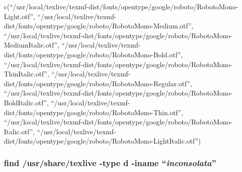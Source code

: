 \documentclass[
]{article}
\newenvironment{Shaded}{\begin{snugshade}}{\end{snugshade}}
\newcommand{\AttributeTok}[1]{\textcolor[rgb]{0.13,0.29,0.53}{#1}}
\newcommand{\ConstantTok}[1]{\textcolor[rgb]{0.56,0.35,0.01}{#1}}
\newcommand{\ControlFlowTok}[1]{\textcolor[rgb]{0.13,0.29,0.53}{\textbf{#1}}}
\newcommand{\DecValTok}[1]{\textcolor[rgb]{0.00,0.00,0.81}{#1}}
\newcommand{\FunctionTok}[1]{\textcolor[rgb]{0.13,0.29,0.53}{\textbf{#1}}}
\newcommand{\NormalTok}[1]{#1}
\newcommand{\SpecialCharTok}[1]{\textcolor[rgb]{0.81,0.36,0.00}{\textbf{#1}}}
\newcommand{\StringTok}[1]{\textcolor[rgb]{0.31,0.60,0.02}{#1}}
\begin{document}
\begin{Shaded}
\end{Shaded}

c(``/usr/local/texlive/texmf-dist/fonts/opentype/google/roboto/RobotoMono-Light.otf'',
``/usr/local/texlive/texmf-dist/fonts/opentype/google/roboto/RobotoMono-Medium.otf'',
``/usr/local/texlive/texmf-dist/fonts/opentype/google/roboto/RobotoMono-MediumItalic.otf'',
``/usr/local/texlive/texmf-dist/fonts/opentype/google/roboto/RobotoMono-Bold.otf'',
``/usr/local/texlive/texmf-dist/fonts/opentype/google/roboto/RobotoMono-ThinItalic.otf'',
``/usr/local/texlive/texmf-dist/fonts/opentype/google/roboto/RobotoMono-Regular.otf'',
``/usr/local/texlive/texmf-dist/fonts/opentype/google/roboto/RobotoMono-BoldItalic.otf'',
``/usr/local/texlive/texmf-dist/fonts/opentype/google/roboto/RobotoMono-Thin.otf'',
``/usr/local/texlive/texmf-dist/fonts/opentype/google/roboto/RobotoMono-Italic.otf'',
``/usr/local/texlive/texmf-dist/fonts/opentype/google/roboto/RobotoMono-LightItalic.otf'')

\hypertarget{find-usrsharetexlive--type-d--iname-inconsolata}{%
\subsubsection{\texorpdfstring{find /usr/share/texlive -type d -iname
``\emph{inconsolata}''}{find /usr/share/texlive -type d -iname ``inconsolata''}}\label{find-usrsharetexlive--type-d--iname-inconsolata}}
\end{document}
